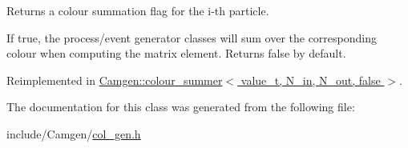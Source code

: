Returns a colour summation flag for the i-\/th particle. 

If true, the process/event generator classes will sum over the corresponding colour when computing the matrix element. Returns false by default. 

Reimplemented in \hyperlink{a00093_a1ab8045a6f4f9254f00de85c7d6e6e46}{Camgen\-::colour\-\_\-summer$<$ value\-\_\-t, N\-\_\-in, N\-\_\-out, false $>$}.



The documentation for this class was generated from the following file\-:\begin{DoxyCompactItemize}
\item 
include/\-Camgen/\hyperlink{a00593}{col\-\_\-gen.\-h}\end{DoxyCompactItemize}
